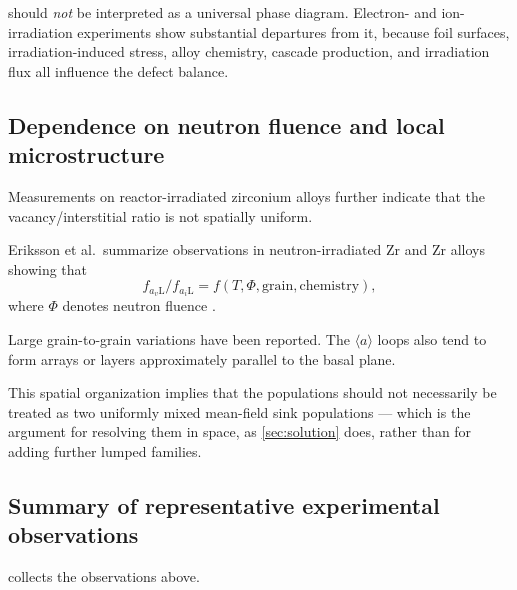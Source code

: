 \documentclass{article}
\newcommand{\aloop}{\ensuremath{\langle a\rangle}}
\newcommand{\aiL}{a_{i}\mathrm{L}}
\newcommand{\avL}{a_{v}\mathrm{L}}
\begin{document}
 should \emph{not} be interpreted as a
universal phase diagram. Electron- and ion-irradiation experiments show
substantial departures from it, because foil surfaces, irradiation-induced
stress, alloy chemistry, cascade production, and irradiation flux all influence
the defect balance.

\subsection{Dependence on neutron fluence and local microstructure}

Measurements on reactor-irradiated zirconium alloys further indicate that the
vacancy/interstitial ratio is not spatially uniform.

Eriksson et al.\ summarize observations in neutron-irradiated Zr and Zr alloys
showing that
\begin{equation}
    \boxed{
    f_{\avL}/f_{\aiL}
    =
    f(T,\Phi,\text{grain},\text{chemistry}),
    }
\end{equation}
where $\Phi$ denotes neutron fluence \citep{eriksson2021atom}.

Large grain-to-grain variations have been reported. The \aloop{} loops also tend
to form arrays or layers approximately parallel to the basal plane.

This spatial organization implies that the populations should not necessarily be
treated as two uniformly mixed mean-field sink populations --- which is the
argument for resolving them in space, as \cref{sec:solution} does, rather than
for adding further lumped families.

\subsection{Summary of representative experimental observations}

 collects the observations above.
\end{document}
